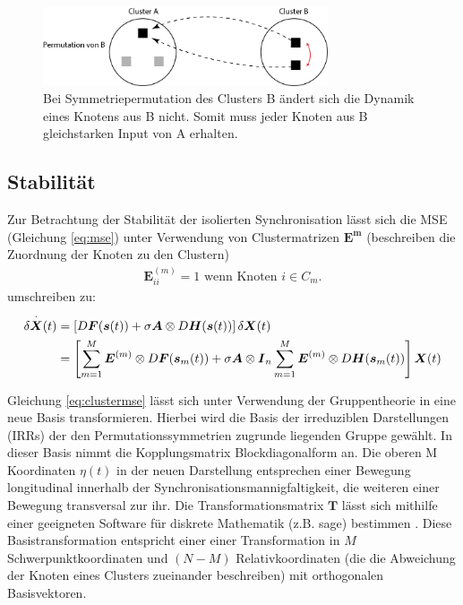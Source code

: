 	\begin{figure}
		\includegraphics[width=0.75\textwidth]{abb/misc/perm_b.png}
		\caption{Bei Symmetriepermutation des Clusters B ändert sich die Dynamik eines Knotens aus B nicht. Somit muss jeder Knoten aus B gleichstarken Input von A erhalten.}
		\label{fig:permb}
	\end{figure}
	

\subsection*{Stabilität}
\label{stabilitaet}
Zur Betrachtung der Stabilität der isolierten Synchronisation lässt sich die MSE (Gleichung \ref{eq:mse})  unter Verwendung von Clustermatrizen $\boldsymbol{E^m}$ (beschreiben die Zuordnung der Knoten zu den Clustern)
\begin{align}
 \boldsymbol{E}^{(m)}_{ii} =1\text{ wenn Knoten }i \in C_m.
\end{align}
 umschreiben zu:
\begin{align}
	\label{eq:clustermse}
\notag	\delta\overset{\cdot}{\boldsymbol{X}}(t)&=	
	\left[D\boldsymbol{F}(\boldsymbol{s}(t))+\sigma\boldsymbol{A}\otimes D\boldsymbol{H}(\boldsymbol{s}(t))\right]\delta\boldsymbol{X}(t)\\&=
	\left[\sum_{m=1}^{M} \boldsymbol{E}^{(m)} \otimes D\boldsymbol{F}(\boldsymbol{s}_m(t))+\sigma\boldsymbol{A}\otimes \boldsymbol{I}_n\sum_{m=1}^{M} 			\boldsymbol{E}^{(m)}\otimes D\boldsymbol{H}(\boldsymbol{s}_m(t))\right]\boldsymbol{X}(t)
	\end{align}
	
Gleichung \ref{eq:clustermse} lässt sich unter Verwendung der Gruppentheorie in eine neue Basis transformieren. Hierbei wird die Basis der irreduziblen Darstellungen (IRRs) der den Permutationssymmetrien zugrunde liegenden Gruppe gewählt. In dieser Basis nimmt die Kopplungsmatrix Blockdiagonalform an. Die oberen M Koordinaten $\eta(t)$ in der neuen Darstellung entsprechen einer Bewegung longitudinal innerhalb der Synchronisationsmannigfaltigkeit, die weiteren einer Bewegung transversal zur ihr. Die Transformationsmatrix $\boldsymbol{T}$ lässt sich mithilfe einer geeigneten Software für diskrete Mathematik (z.B. sage) bestimmen \citep{sagenotebook}. Diese Basistransformation entspricht einer einer Transformation in $M$ Schwerpunktkoordinaten und $(N-M)$ Relativkoordinaten (die die Abweichung der Knoten eines Clusters zueinander beschreiben) mit orthogonalen Basisvektoren.

